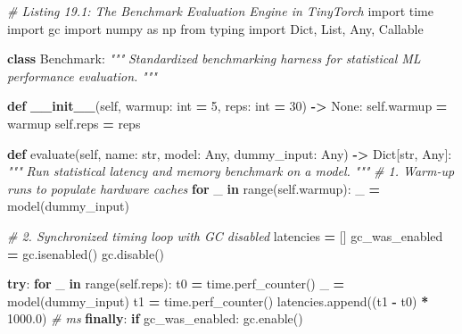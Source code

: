 \documentclass[
  letterpaper,
]{scrbook}
\newenvironment{Shaded}{\begin{snugshade}}{\end{snugshade}}
\newcommand{\BuiltInTok}[1]{#1}
\newcommand{\CommentTok}[1]{\textcolor[rgb]{0.56,0.35,0.01}{\textit{#1}}}
\newcommand{\ControlFlowTok}[1]{\textcolor[rgb]{0.13,0.29,0.53}{\textbf{#1}}}
\newcommand{\DecValTok}[1]{\textcolor[rgb]{0.00,0.00,0.81}{#1}}
\newcommand{\FloatTok}[1]{\textcolor[rgb]{0.00,0.00,0.81}{#1}}
\newcommand{\FunctionTok}[1]{\textcolor[rgb]{0.13,0.29,0.53}{\textbf{#1}}}
\newcommand{\ImportTok}[1]{#1}
\newcommand{\KeywordTok}[1]{\textcolor[rgb]{0.13,0.29,0.53}{\textbf{#1}}}
\newcommand{\NormalTok}[1]{#1}
\newcommand{\OperatorTok}[1]{\textcolor[rgb]{0.81,0.36,0.00}{\textbf{#1}}}
\newcommand{\VariableTok}[1]{\textcolor[rgb]{0.00,0.00,0.00}{#1}}
\begin{document}
\begin{Shaded}
\begin{Highlighting}[]
\CommentTok{\# Listing 19.1: The Benchmark Evaluation Engine in TinyTorch}
\ImportTok{import}\NormalTok{ time}
\ImportTok{import}\NormalTok{ gc}
\ImportTok{import}\NormalTok{ numpy }\ImportTok{as}\NormalTok{ np}
\ImportTok{from}\NormalTok{ typing }\ImportTok{import}\NormalTok{ Dict, List, Any, Callable}

\KeywordTok{class}\NormalTok{ Benchmark:}
    \CommentTok{"""}
\CommentTok{    Standardized benchmarking harness for statistical ML performance evaluation.}
\CommentTok{    """}

    \KeywordTok{def} \FunctionTok{\_\_init\_\_}\NormalTok{(}\VariableTok{self}\NormalTok{, warmup: }\BuiltInTok{int} \OperatorTok{=} \DecValTok{5}\NormalTok{, reps: }\BuiltInTok{int} \OperatorTok{=} \DecValTok{30}\NormalTok{) }\OperatorTok{{-}\textgreater{}} \VariableTok{None}\NormalTok{:}
        \VariableTok{self}\NormalTok{.warmup }\OperatorTok{=}\NormalTok{ warmup}
        \VariableTok{self}\NormalTok{.reps }\OperatorTok{=}\NormalTok{ reps}

    \KeywordTok{def}\NormalTok{ evaluate(}\VariableTok{self}\NormalTok{, name: }\BuiltInTok{str}\NormalTok{, model: Any, dummy\_input: Any) }\OperatorTok{{-}\textgreater{}}\NormalTok{ Dict[}\BuiltInTok{str}\NormalTok{, Any]:}
        \CommentTok{"""}
\CommentTok{        Run statistical latency and memory benchmark on a model.}
\CommentTok{        """}
        \CommentTok{\# 1. Warm{-}up runs to populate hardware caches}
        \ControlFlowTok{for}\NormalTok{ \_ }\KeywordTok{in} \BuiltInTok{range}\NormalTok{(}\VariableTok{self}\NormalTok{.warmup):}
\NormalTok{            \_ }\OperatorTok{=}\NormalTok{ model(dummy\_input)}

        \CommentTok{\# 2. Synchronized timing loop with GC disabled}
\NormalTok{        latencies }\OperatorTok{=}\NormalTok{ []}
\NormalTok{        gc\_was\_enabled }\OperatorTok{=}\NormalTok{ gc.isenabled()}
\NormalTok{        gc.disable()}

        \ControlFlowTok{try}\NormalTok{:}
            \ControlFlowTok{for}\NormalTok{ \_ }\KeywordTok{in} \BuiltInTok{range}\NormalTok{(}\VariableTok{self}\NormalTok{.reps):}
\NormalTok{                t0 }\OperatorTok{=}\NormalTok{ time.perf\_counter()}
\NormalTok{                \_ }\OperatorTok{=}\NormalTok{ model(dummy\_input)}
\NormalTok{                t1 }\OperatorTok{=}\NormalTok{ time.perf\_counter()}
\NormalTok{                latencies.append((t1 }\OperatorTok{{-}}\NormalTok{ t0) }\OperatorTok{*} \FloatTok{1000.0}\NormalTok{)  }\CommentTok{\# ms}
        \ControlFlowTok{finally}\NormalTok{:}
            \ControlFlowTok{if}\NormalTok{ gc\_was\_enabled:}
\NormalTok{                gc.enable()}


\end{Highlighting}
\end{Shaded}
\end{document}
